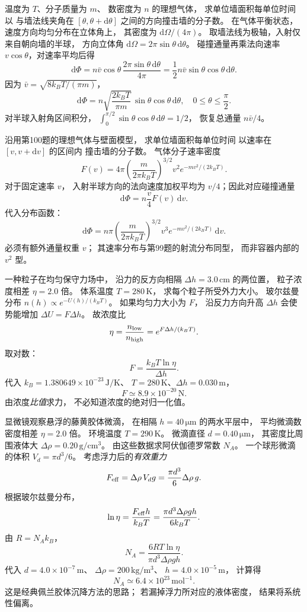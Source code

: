 温度为 $T$、分子质量为 $m$、
数密度为 $n$ 的理想气体，
求单位墙面积每单位时间以
与墙法线夹角在
$[\theta,\theta+\mathrm d\theta]$
之间的方向撞击墙的分子数。
\exsolution
在气体平衡状态，
速度方向均匀分布在立体角上，
其密度为 $\mathrm d\Omega/(4\pi)$。
取墙法线为极轴，入射仅来自朝向墙的半球，
方向立体角
$\mathrm d\Omega=2\pi\sin\theta\,\mathrm d\theta$。
碰撞通量再乘法向速率
$v\cos\theta$，对速率平均后得
\[
\mathrm d\Phi=
n\bar v\cos\theta\,
\frac{2\pi\sin\theta\,\mathrm d\theta}{4\pi}
=\frac12n\bar v\sin\theta\cos\theta\,\mathrm d\theta.
\]
因为
$\bar v=\sqrt{8k_BT/(\pi m)}$，
\[
\boxed{\mathrm d\Phi=
n\sqrt{\frac{2k_BT}{\pi m}}\,
\sin\theta\cos\theta\,\mathrm d\theta},
\quad 0\le\theta\le\frac\pi2.
\]
\excheck 对半球入射角区间积分，
$\int_0^{\pi/2}\sin\theta\cos\theta\,\mathrm d\theta=1/2$，
恢复总通量 $n\bar v/4$。

沿用第100题的理想气体与壁面模型，
求单位墙面积每单位时间
以速率在 $[v,v+\mathrm dv]$ 的区间内
撞击墙的分子数。
\exsolution
气体分子速率密度
\[
F(v)=4\pi\left(\frac m{2\pi k_BT}\right)^{3/2}
v^2e^{-mv^2/(2k_BT)}.
\]
对于固定速率 $v$，
入射半球方向的法向速度加权平均为
$v/4$；因此对应碰撞通量
\[
\mathrm d\Phi=
n\frac v4F(v)\,\mathrm dv.
\]
代入分布函数：
\[
\boxed{\mathrm d\Phi=
n\pi\left(\frac m{2\pi k_BT}\right)^{3/2}
v^3e^{-mv^2/(2k_BT)}\,\mathrm dv}.
\]
\excheck 必须有额外通量权重 $v$；
其速率分布与第99题的射流分布同型，
而非容器内部的 $v^2$ 型。

一种粒子在均匀保守力场中，
沿力的反方向相隔
$\Delta h=3.0\,\mathrm{cm}$ 的两位置，
粒子浓度相差
$\eta=2.0$ 倍。
体系温度 $T=280\,\mathrm K$，
求每个粒子所受外力大小。
\exsolution
玻尔兹曼分布
$n(h)\propto e^{-U(h)/(k_BT)}$。
如果均匀力大小为 $F$，
沿反力方向升高 $\Delta h$
会使势能增加
$\Delta U=F\Delta h$。
故浓度比
\[
\eta=\frac{n_{\rm low}}{n_{\rm high}}
=e^{F\Delta h/(k_BT)}.
\]
取对数：
\[
\boxed{F=\frac{k_BT\ln\eta}{\Delta h}}.
\]
代入
$k_B=1.380649\times10^{-23}\,\mathrm{J/K}$、
$T=280\,\mathrm K$、$\Delta h=0.030\,\mathrm m$，
\[
\boxed{F\simeq8.9\times10^{-20}\,\mathrm N}.
\]
\excheck 由浓度\emph{比值}求力，
不必知道浓度的绝对归一化值。

显微镜观察悬浮的藤黄胶体微滴，
在相隔 $h=40\,\mathrm{\mu m}$
的两水平层中，
平均微滴数密度相差 $\eta=2.0$ 倍。
环境温度 $T=290\,\mathrm K$。
微滴直径 $d=0.40\,\mathrm{\mu m}$，
其密度比周围液体大
$\Delta\rho=0.20\,\mathrm{g/cm^3}$。
由这些数据求阿伏伽德罗常数 $N_A$。
\exsolution
一个球形微滴的体积
$V_d=\pi d^3/6$。
考虑浮力后的\emph{有效重力}
\[
F_{\rm eff}=\Delta\rho\,V_d g
=\frac{\pi d^3}{6}\Delta\rho\,g.
\]
根据玻尔兹曼分布，
\[
\ln\eta=\frac{F_{\rm eff}h}{k_BT}
=\frac{\pi d^3\Delta\rho gh}
{6k_BT}.
\]
由 $R=N_Ak_B$，
\[
\boxed{N_A=\frac{6RT\ln\eta}
{\pi d^3\Delta\rho gh}}.
\]
代入
$d=4.0\times10^{-7}\,\mathrm m$、
$\Delta\rho=200\,\mathrm{kg/m^3}$、
$h=4.0\times10^{-5}\,\mathrm m$，
计算得
\[
\boxed{N_A\simeq6.4\times10^{23}\,\mathrm{mol^{-1}}}.
\]
\excheck 这是经典佩兰胶体沉降方法的思路；
若漏掉浮力所对应的液体密度，
结果将系统性偏离。

